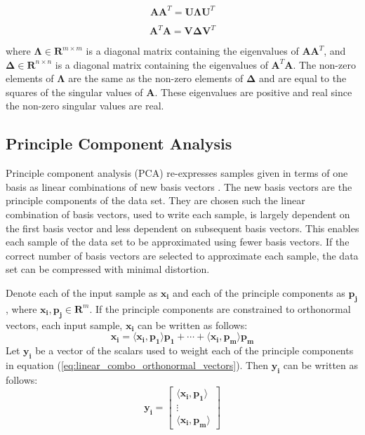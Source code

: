 \documentclass[conference]{IEEEtran}
\begin{document}
    \begin{equation}
         \mathbf{AA}^{T} = \mathbf{U\Lambda}\mathbf{U}^T
    \label{eq:aatranspose}
    \end{equation}

    \begin{equation}
         \mathbf{A}^T\mathbf{A} = \mathbf{V\Delta}\mathbf{V}^T
    \label{eq:atransposea}
    \end{equation}
    
    where $\mathbf{\Lambda} \in \mathbf{R}^{m \times m}$ is a diagonal matrix containing the eigenvalues of $\mathbf{AA}^{T}$, and $\mathbf{\Delta} \in \mathbf{R}^{n \times n}$ is a diagonal matrix containing the eigenvalues of $\mathbf{A}^T\mathbf{A}$. The non-zero elements of $\mathbf{\Lambda}$ are the same as the non-zero elements of $\mathbf{\Delta}$ and are equal to the squares of the singular values of $\mathbf{A}$. These eigenvalues are positive and real since the non-zero singular values are real.
    
    \subsection{Principle Component Analysis}
    
    Principle component analysis (PCA) re-expresses samples given in terms of one basis as linear combinations of new basis vectors \cite{shlens_2014_tutorial}. The new basis vectors are the principle components of the data set. They are chosen such the linear combination of basis vectors, used to write each sample, is largely dependent on the first basis vector and less dependent on subsequent basis vectors. This enables each sample of the data set to be approximated using fewer basis vectors. If the correct number of basis vectors are selected to approximate each sample, the data set can be compressed with minimal distortion.
    
    Denote each of the input sample as $\mathbf{x_i}$ and each of the principle components as $\mathbf{p_j}$, where $\mathbf{x_i}, \mathbf{p_j} \in \mathbf{R}^{m}$. If the principle components are constrained to orthonormal vectors, each input sample, $\mathbf{x_i}$ can be written as follows:
    \begin{equation}
    		\mathbf{x_i} = \langle \mathbf{x_i}, \mathbf{p_1} \rangle \mathbf{p_1} + \cdots + \langle \mathbf{x_i}, \mathbf{p_m} \rangle \mathbf{p_m}
    		\label{eq:linear_combo_orthonormal_vectors}
    	\end{equation}
    	Let $\mathbf{y_i}$ be a vector of the scalars used to weight each of the principle components in equation (\ref{eq:linear_combo_orthonormal_vectors}). Then $\mathbf{y_i}$ can be written as follows:
    	\begin{equation}
        \mathbf{y_i} = \begin{bmatrix}
                        \langle \mathbf{x_i}, \mathbf{p_1} \rangle\\
                        \vdots \\
                        \langle \mathbf{x_i}, \mathbf{p_m}\rangle
                        \end{bmatrix}
    \end{equation}
    
\end{document}
